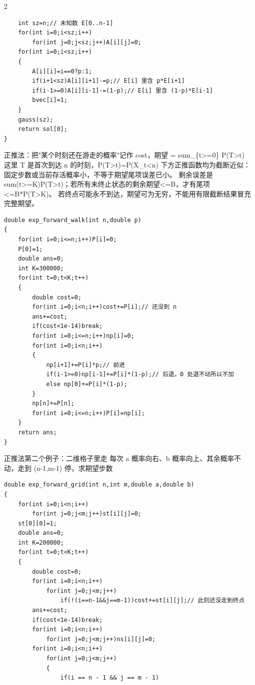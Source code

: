 \documentclass[UTF8,fontset=fandol,a4paper,twoside]{ctexart}
\newcommand{\note}[1]{{\fontsize{10}{12}\selectfont #1\par}}
\begin{document}
\begin{multicols}{2}
\begin{lstlisting}
    int sz=n;// 未知数 E[0..n-1]
    for(int i=0;i<sz;i++)
        for(int j=0;j<sz;j++)A[i][j]=0;
    for(int i=0;i<sz;i++)
    {
        A[i][i]=i==0?p:1;
        if(i+1<sz)A[i][i+1]-=p;// E[i] 里含 p*E[i+1]
        if(i-1>=0)A[i][i-1]-=(1-p);// E[i] 里含 (1-p)*E[i-1]
        bvec[i]=1;
    }
    gauss(sz);
    return sol[0];
}
\end{lstlisting}
\note{正推法：把"某个时刻还在游走的概率"记作 cost，期望 =\allowbreak{} sum\_\{t>\allowbreak{}=\allowbreak{}0\} P(\allowbreak{}T>\allowbreak{}t)\allowbreak{} 这里 T 是首次到达 n 的时刻，P(\allowbreak{}T>\allowbreak{}t)\allowbreak{}=\allowbreak{}P(\allowbreak{}X\_t<\allowbreak{}n)\allowbreak{} 下方正推函数均为截断近似：固定步数或当前存活概率小，不等于期望尾项误差已小。 剩余误差是 sum(\allowbreak{}t>\allowbreak{}=\allowbreak{}K)\allowbreak{}P(\allowbreak{}T>\allowbreak{}t)\allowbreak{}；若所有未终止状态的剩余期望<\allowbreak{}=\allowbreak{}B，才有尾项<\allowbreak{}=\allowbreak{}B*P(\allowbreak{}T>\allowbreak{}K)\allowbreak{}。 若终点可能永不到达，期望可为无穷，不能用有限截断结果冒充完整期望。}
\begin{lstlisting}
double exp_forward_walk(int n,double p)
{
    for(int i=0;i<=n;i++)P[i]=0;
    P[0]=1;
    double ans=0;
    int K=300000;
    for(int t=0;t<K;t++)
    {
        double cost=0;
        for(int i=0;i<n;i++)cost+=P[i];// 还没到 n
        ans+=cost;
        if(cost<1e-14)break;
        for(int i=0;i<=n;i++)np[i]=0;
        for(int i=0;i<n;i++)
        {
            np[i+1]+=P[i]*p;// 前进
            if(i-1>=0)np[i-1]+=P[i]*(1-p);// 后退，0 处退不动所以不加
            else np[0]+=P[i]*(1-p);
        }
        np[n]+=P[n];
        for(int i=0;i<=n;i++)P[i]=np[i];
    }
    return ans;
}
\end{lstlisting}
\note{正推法第二个例子：二维格子里走 每次 a 概率向右、b 概率向上、其余概率不动，走到 (\allowbreak{}n-\allowbreak{}1,\allowbreak{}m-\allowbreak{}1)\allowbreak{} 停，求期望步数}
\begin{lstlisting}
double exp_forward_grid(int n,int m,double a,double b)
{
    for(int i=0;i<n;i++)
        for(int j=0;j<m;j++)st[i][j]=0;
    st[0][0]=1;
    double ans=0;
    int K=200000;
    for(int t=0;t<K;t++)
    {
        double cost=0;
        for(int i=0;i<n;i++)
            for(int j=0;j<m;j++)
                if(!(i==n-1&&j==m-1))cost+=st[i][j];// 此刻还没走到终点
        ans+=cost;
        if(cost<1e-14)break;
        for(int i=0;i<n;i++)
            for(int j=0;j<m;j++)ns[i][j]=0;
        for(int i=0;i<n;i++)
            for(int j=0;j<m;j++)
            {
                if(i == n - 1 && j == m - 1)

\end{lstlisting}
\end{multicols}
\end{document}

